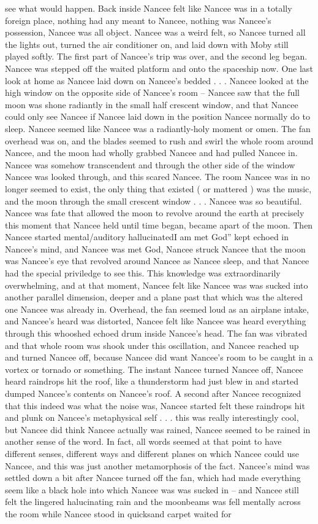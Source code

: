 \documentclass[12pt]{book}
\begin{document}
see what would happen. Back inside Nancee felt like Nancee was in a totally foreign place, nothing had any meant to Nancee, nothing was Nancee's possession, Nancee was all object. Nancee was a weird felt, so Nancee turned all the lights out, turned the air conditioner on, and laid down with Moby still played softly. The first part of Nancee's trip was over, and the second leg began. Nancee was stepped off the waited platform and onto the spaceship now. One last look at home as Nancee laid down on Nancee's bedded  . . .  Nancee looked at the high window on the opposite side of Nancee's room -- Nancee saw that the full moon was shone radiantly in the small half crescent window, and that Nancee could only see Nancee if Nancee laid down in the position Nancee normally do to sleep. Nancee seemed like Nancee was a radiantly-holy moment or omen. The fan overhead was on, and the blades seemed to rush and swirl the whole room around Nancee, and the moon had wholly grabbed Nancee and had pulled Nancee in. Nancee was somehow transcendent and through the other side of the window Nancee was looked through, and this scared Nancee. The room Nancee was in no longer seemed to exist, the only thing that existed ( or mattered ) was the music, and the moon through the small crescent window . . .  Nancee was so beautiful. Nancee was fate that allowed the moon to revolve around the earth at precisely this moment that Nancee held until time began, became apart of the moon. Then Nancee started mental/auditory hallucinatedI am met God'' kept echoed in Nancee's mind, and Nancee was met God, Nancee struck Nancee that the moon was Nancee's eye that revolved around Nancee as Nancee sleep, and that Nancee had the special priviledge to see this. This knowledge was extraordinarily overwhelming, and at that moment, Nancee felt like Nancee was was sucked into another parallel dimension, deeper and a plane past that which was the altered one Nancee was already in. Overhead, the fan seemed loud as an airplane intake, and Nancee's heard was distorted, Nancee felt like Nancee was heard everything through this whooshed echoed drum inside Nancee's head. The fan was vibrated and that whole room was shook under this oscillation, and Nancee reached up and turned Nancee off, because Nancee did want Nancee's room to be caught in a vortex or tornado or something. The instant Nancee turned Nancee off, Nancee heard raindrops hit the roof, like a thunderstorm had just blew in and started dumped Nancee's contents on Nancee's roof. A second after Nancee recognized that this indeed was what the noise was, Nancee started felt these raindrops hit and plunk on Nancee's metaphysical self  . . .  this was really interestingly cool, but Nancee did think Nancee actually was rained, Nancee seemed to be rained in another sense of the word. In fact, all words seemed at that point to have different senses, different ways and different planes on which Nancee could use Nancee, and this was just another metamorphosis of the fact. Nancee's mind was settled down a bit after Nancee turned off the fan, which had made everything seem like a black hole into which Nancee was was sucked in -- and Nancee still felt the lingered halucinating rain and the moonbeams was fell mentally across the room while Nancee stood in quicksand carpet waited for 
\end{document}
